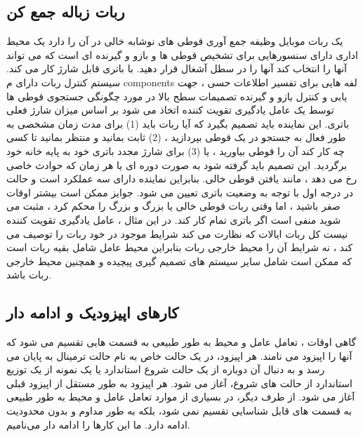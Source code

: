 \subsection{ربات زباله جمع کن}
یک ربات موبایل وظیفه جمع آوری قوطی های نوشابه خالی در آن را دارد
یک محیط اداری دارای سنسورهایی برای تشخیص قوطی ها و بازو و گیرنده ای است که می تواند آنها را انتخاب کند
آنها را در سطل آشغال قرار دهید. با باتری قابل شارژ کار می کند. سیستم کنترل ربات
دارای م components لفه هایی برای تفسیر اطلاعات حسی ، جهت یابی و کنترل بازو و
گیرنده تصمیمات سطح بالا در مورد چگونگی جستجوی قوطی ها توسط یک عامل یادگیری تقویت کننده اتخاذ می شود
بر اساس میزان شارژ فعلی باتری. این نماینده باید تصمیم بگیرد که آیا ربات باید (1)
برای مدت زمان مشخصی به طور فعال به جستجو در یک قوطی بپردازید ، (2) ثابت بمانید و منتظر بمانید تا کسی چه کار کند
آن را قوطی بیاورید ، یا (3) برای شارژ مجدد باتری خود به پایه خانه خود برگردید. این تصمیم باید گرفته شود
به صورت دوره ای یا هر زمان که حوادث خاصی رخ می دهد ، مانند یافتن قوطی خالی. بنابراین نماینده
دارای سه عملکرد است و حالت در درجه اول با توجه به وضعیت باتری تعیین می شود. جوایز ممکن است
بیشتر اوقات صفر باشید ، اما وقتی ربات قوطی خالی یا بزرگ و بزرگ را محکم کرد ، مثبت می شوید
منفی است اگر باتری تمام کار کند. در این مثال ، عامل یادگیری تقویت کننده نیست
کل ربات ایالات که نظارت می کند شرایط موجود در خود ربات را توصیف می کند ، نه شرایط آن را
محیط خارجی ربات بنابراین محیط عامل شامل بقیه ربات است که
ممکن است شامل سایر سیستم های تصمیم گیری پیچیده و همچنین محیط خارجی ربات باشد.



\subsection{کارهای اپیزودیک و ادامه دار}
گاهی اوقات ، تعامل عامل و محیط به طور طبیعی به قسمت هایی تقسیم می شود که آنها را اپیزود می نامند. هر اپیزود، در یک حالت خاص به نام حالت ترمینال به پایان می رسد و به دنبال آن دوباره از یک حالت شروع استاندارد یا یک نمونه از یک توزیع استاندارد از حالت های شروع، آغاز می شود. هر اپیزود به طور مستقل از اپیزود قبلی آغاز می شود.
از طرف دیگر، در بسیاری از موارد تعامل عامل و محیط به طور طبیعی به قسمت های قابل شناسایی تقسیم نمی شود، بلکه به طور مداوم و بدون محدودیت ادامه دارد. ما این کارها را ادامه دار می‌نامیم.



